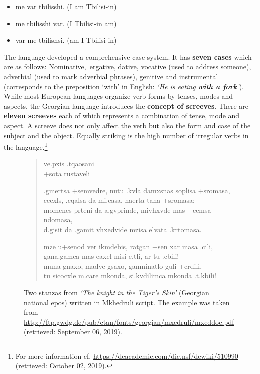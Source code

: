 \begin{itemize}\setlength\itemsep{-1em}
	\item me var tbilisshi. (I am Tbilisi-in)
	\item me tbilisshi var. (I Tbilisi-in am)
	\item var me tbilishsi. (am I Tbilisi-in)
\end{itemize}

The language developed a comprehensive case system. It has \textbf{seven cases} which are as follows:  Nominative, \,ergative,  dative,  vocative (used to address someone),  adverbial (used to mark adverbial phrases),  genitive and  instrumental (corresponds to the preposition `with' in English: \textit{`He is eating \textbf{with a fork}'}). While most European languages organize verb forms by tenses, modes and aspects, the Georgian language introduces the \textbf{concept of screeves}. There are \textbf{eleven screeves} each of which represents a combination of tense, mode and aspect. A screeve does not only affect the verb but also the form and case of the subject and the object. Equally striking is the high number of irregular verbs in the language.\footnote{For more information cf. \url{https://deacademic.com/dic.nsf/dewiki/510990} (retrieved: October 02, 2019).}

\begin{figure}[h]
	\begin{verse}
		{\Large\mxedc ve.pxis .tqaosani} \\
		\medskip
		{\large\mxedc +sota rustaveli} \\
		\bigskip
		\begin{mxedr}
			.gmertsa +semvedre, nutu .kvla damxsnas soplisa +sromasa,		\\
			cecxls, .cqalsa da mi.casa, haerta tana +sromasa;					\\
			momcnes prteni da a.gvprinde, mivhxvde mas +cemsa ndomasa,	\\
			d.gisit da .gamit vhxedvide mzisa elvata .krtomasa.
		
			\medskip
		
			mze u+senod ver ikmdebis, ratgan +sen xar masa .cili,			\\
			gana.gamca mas eaxel misi e.tli, ar tu .cbili!						\\
			muna gnaxo, madve gsaxo, ganminatlo guli +crdili,				\\
			tu sicocxle m.care mkonda, si.kvdilimca mkonda .t.kbili!
		\end{mxedr}
	\end{verse}
	\caption[Two stanzas from \textit{`The knight in the Tiger's Skin'} written in Mkhedruli script]
		{Two stanzas from \textit{`The knight in the Tiger's Skin'} (Georgian national epos) written in Mkhedruli script.
		The example was taken from \url{http://ftp.gwdg.de/pub/ctan/fonts/georgian/mxedruli/mxeddoc.pdf} \\
		(retrieved: September 06, 2019).}
	\label{fig:mkhedruli}
\end{figure}

